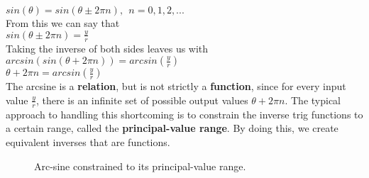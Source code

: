 \tab$sin(\theta) = sin(\theta \pm 2\pi n), \ \ n=0,1,2,...$\\

From this we can say that\\

\tab$sin(\theta \pm 2\pi n) = \frac{y}{r}$\\

Taking the inverse of both sides leaves us with\\

\tab$arcsin(sin(\theta + 2\pi n)) = arcsin(\frac{y}{r})$\\

\tab$\theta + 2\pi n = arcsin(\frac{y}{r})$\\

The arcsine is a {\bf relation}, but is not strictly a {\bf function}, since for every input value $\frac{y}{r}$, there is an infinite set of possible output values $\theta + 2\pi n$.  The typical approach to handling this shortcoming is to constrain the inverse trig functions to a certain range, called the {\bf principal-value range}.  By doing this, we create equivalent inverses that are functions.\\

\begin{figure}[htb!]
\center
\caption{Arc-sine constrained to its principal-value range.}
\label{fig:principal value arc sine}
\end{figure}

